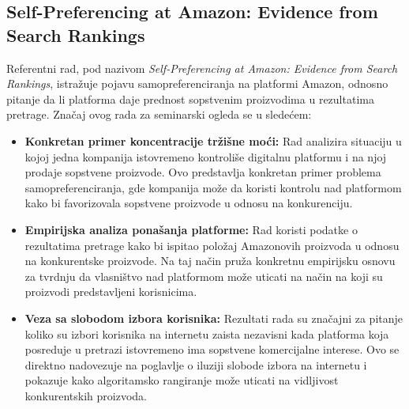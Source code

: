 \documentclass[12pt,a4paper]{article}
\begin{document}
\newpage

\subsection{Self-Preferencing at Amazon: Evidence from Search Rankings}

Referentni rad, pod nazivom \textit{Self-Preferencing at Amazon: Evidence from
Search Rankings}, istražuje pojavu samopreferenciranja na platformi Amazon,
odnosno pitanje da li platforma daje prednost sopstvenim proizvodima u
rezultatima pretrage. Značaj ovog rada za seminarski ogleda se u sledećem:

\begin{itemize}

    \item \textbf{Konkretan primer koncentracije tržišne moći:} Rad analizira
    situaciju u kojoj jedna kompanija istovremeno kontroliše digitalnu
    platformu i na njoj prodaje sopstvene proizvode. Ovo predstavlja konkretan
    primer problema samopreferenciranja, gde kompanija može da koristi kontrolu
    nad platformom kako bi favorizovala sopstvene proizvode u odnosu na konkurenciju.

    \item \textbf{Empirijska analiza ponašanja platforme:} Rad koristi podatke o rezultatima
    pretrage kako bi ispitao položaj Amazonovih proizvoda u odnosu na
    konkurentske proizvode. Na taj način pruža konkretnu empirijsku osnovu za
    tvrdnju da vlasništvo nad platformom može uticati na način na koji su
    proizvodi predstavljeni korisnicima.

    \item \textbf{Veza sa slobodom izbora korisnika:} Rezultati rada su značajni
    za pitanje koliko su izbori korisnika na internetu zaista nezavisni kada
    platforma koja posreduje u pretrazi istovremeno ima sopstvene komercijalne
    interese. Ovo se direktno nadovezuje na poglavlje o iluziji slobode izbora
    na internetu i pokazuje kako algoritamsko rangiranje može uticati na
    vidljivost konkurentskih proizvoda.

\end{itemize}

\newpage
\end{document}

